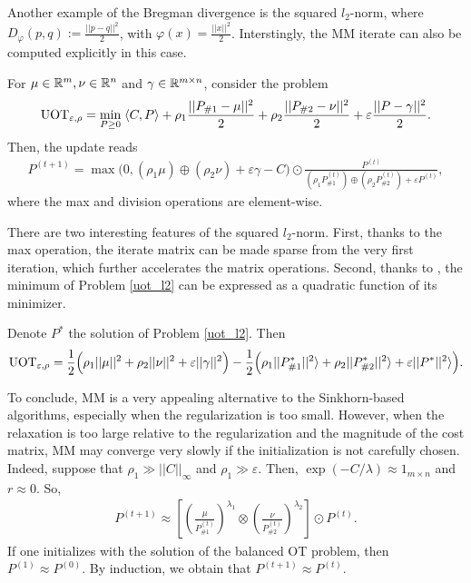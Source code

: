 Another example of the Bregman divergence is the squared $l_2$-norm, where
$D_{\varphi}(p, q) := \frac{|| p - q||^2}{2}$, with $\varphi(x) = \frac{||x||^2}{2}$. Interstingly,
the MM iterate can also be computed explicitly in this case.
\begin{corollary}
  \label{coro:uot_l2_mm}
  For $\mu \in \mathbb R^m, \nu \in \mathbb R^n$ and $\gamma \in \mathbb R^{m \times n}$,  consider the
  problem
  \begin{align}
  \label{uot_l2}
      \text{UOT}_{\varepsilon, \rho} =
      \min_{P \geq 0} \; \langle C, P \rangle + \rho_1 \frac{||P_{\# 1} - \mu||^2}{2}
      + \rho_2 \frac{|| P_{\# 2} - \nu ||^2}{2} + \varepsilon  \frac{||P - \gamma||^2}{2}.
  \end{align}
  Then, the update reads
  \begin{align}
      P^{(t+1)} = \max \Big(0, (\rho_1 \mu) \oplus (\rho_2 \nu) + \varepsilon \gamma - C \Big)
      \odot \frac{P^{(t)}}{(\rho_1 P^{(t)}_{\# 1}) \oplus (\rho_2 P^{(t)}_{\# 2})
      + \varepsilon P^{(t)}},
  \end{align}
  where the max and division operations are element-wise.
\end{corollary}
There are two interesting features of the squared $l_2$-norm. First, thanks to the max operation,
the iterate matrix can be made sparse from the very first iteration,
which further accelerates the matrix operations. Second, thanks to ,
the minimum of Problem \eqref{uot_l2} can be expressed as a quadratic function of its minimizer.
\begin{corollary}
  \label{coro:uot_l2_minimizer}
Denote $P^*$ the solution of Problem \eqref{uot_l2}. Then
\begin{align}
  \text{UOT}_{\varepsilon, \rho} = \frac{1}{2} \Big( \rho_1 ||\mu||^2
  + \rho_2 ||\nu||^2 + \varepsilon ||\gamma||^2 \Big)
  - \frac{1}{2} \Big( \rho_1 ||P^*_{\# 1}||^2 \rangle
  + \rho_2 || P^*_{\# 2} ||^2 \rangle + \varepsilon ||P^*||^2 \rangle \Big).
\end{align}
\end{corollary}
To conclude, MM is a very appealing alternative to the Sinkhorn-based algorithms,
especially when the regularization is too small. However,
when the relaxation is too large relative to the regularization and
the magnitude of the cost matrix, MM may converge very slowly if the initialization is
not carefully chosen. Indeed, suppose that $\rho_1 \gg ||C||_{\infty}$ and $\rho_1 \gg \varepsilon$.
Then, $\exp(-C / \lambda) \approx 1_{m \times n}$ and $r \approx 0$. So,
\begin{align}
  P^{(t+1)} \approx \left[ \left( \frac{\mu}{P^{(t)}_{\# 1}}\right)^{\lambda_1} \otimes
  \left( \frac{\nu}{P^{(t)}_{\# 2}}\right)^{\lambda_2} \right] \odot P^{(t)}.
\end{align}
If one initializes with the solution of the balanced OT problem, then $P^{(1)} \approx P^{(0)}$.
By induction, we obtain that $P^{(t+1)} \approx P^{(t)}$.

